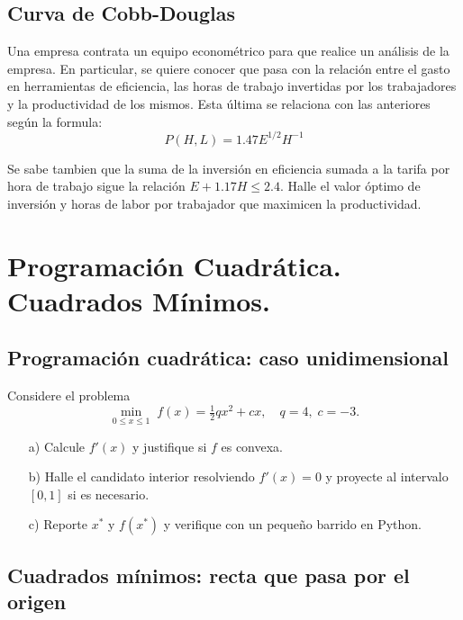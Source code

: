 \documentclass[12pt]{article}
\begin{document}
\subsection{Curva de Cobb-Douglas}

Una empresa contrata un equipo econométrico para que realice un análisis de la empresa. En particular, se quiere conocer que pasa con la relación entre el gasto en herramientas de eficiencia, las horas de trabajo invertidas por los trabajadores  y la productividad de los mismos. Esta última se relaciona con las anteriores según la formula:
\begin{equation*}
    P(H,L) = 1.47  E^{1/2} H^{-1}
\end{equation*}

Se sabe tambien que la suma de la inversión en eficiencia sumada a la tarifa por hora de trabajo sigue la relación $E + 1.17 H \leq 2.4$. Halle el valor óptimo de inversión y horas de labor por trabajador que maximicen la productividad.

\section{Programación Cuadrática. Cuadrados Mínimos.}

\subsection{Programación cuadrática: caso unidimensional}

Considere el problema
\[
\min_{0 \le x \le 1} \; f(x) = \tfrac{1}{2} q x^2 + c x,\quad q=4,\; c=-3.
\]
\begin{itemize}
    \item[a)] Calcule $f'(x)$ y justifique si $f$ es convexa.
    \item[b)] Halle el candidato interior resolviendo $f'(x)=0$ y proyecte al intervalo $[0,1]$ si es necesario.
    \item[c)] Reporte $x^*$ y $f(x^*)$ y verifique con un pequeño barrido en Python.
\end{itemize}

\subsection{Cuadrados mínimos: recta que pasa por el origen}
\end{document}

